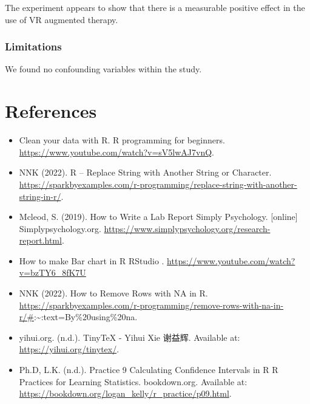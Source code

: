 \documentclass[
]{article}
\begin{document}
The experiment appears to show that there is a measurable positive
effect in the use of VR augmented therapy.

\hypertarget{limitations}{%
\subsubsection{\texorpdfstring{\textbf{Limitations}}{Limitations}}\label{limitations}}

We found no confounding variables within the study.

\hypertarget{references}{%
\section{References}\label{references}}

\begin{itemize}
\item
  Clean your data with R. R programming for beginners.
  \url{https://www.youtube.com/watch?v=sV5lwAJ7vnQ}.
\item
  NNK (2022). R -- Replace String with Another String or Character.
  \url{https://sparkbyexamples.com/r-programming/replace-string-with-another-string-in-r/}.
\item
  Mcleod, S. (2019). How to Write a Lab Report \textbar{} Simply
  Psychology. {[}online{]} Simplypsychology.org.
  \url{https://www.simplypsychology.org/research-report.html}.
\item
  How to make Bar chart in R \textbar{} RStudio \textbar.
  \url{https://www.youtube.com/watch?v=bzTY6_8fK7U}
\item
  NNK (2022). How to Remove Rows with NA in R.
  \url{https://sparkbyexamples.com/r-programming/remove-rows-with-na-in-r/\#}:\textasciitilde:text=By\%20using\%20na.
\item
  yihui.org. (n.d.). TinyTeX - Yihui Xie \textbar{} 谢益辉. Available
  at: \url{https://yihui.org/tinytex/}.
\item
  Ph.D, L.K. (n.d.). Practice 9 Calculating Confidence Intervals in R
  \textbar{} R Practices for Learning Statistics. bookdown.org.
  Available at:
  \url{https://bookdown.org/logan_kelly/r_practice/p09.html}.
\end{itemize}
\end{document}

